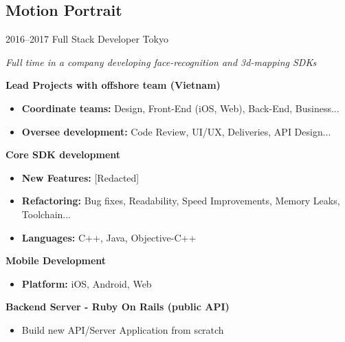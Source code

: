 \documentclass[]{template/friggeri-cv} %
\begin{document}
\subsection{Motion Portrait}
\begin{entrylist}


\entry
{2016--2017}
{Full Stack Developer}
{Tokyo}
{\emph{Full time in a company developing face-recognition and 3d-mapping SDKs}

\textbf{Lead Projects with offshore team (Vietnam)} 
\begin{itemize}
\item \textbf{Coordinate teams:} Design, Front-End (iOS, Web), Back-End, Business...
\item \textbf{Oversee development:} Code Review, UI/UX, Deliveries, API Design...
\end{itemize}
\textbf{Core SDK development} 
\begin{itemize}
\item \textbf{New Features:} [Redacted]
\item \textbf{Refactoring:} Bug fixes, Readability, Speed Improvements, Memory Leaks, Toolchain...
\item \textbf{Languages:} C++, Java, Objective-C++

\end{itemize}
\textbf{Mobile Development} 
\begin{itemize}
\item \textbf{Platform:} iOS, Android, Web
\end{itemize}

\textbf{Backend Server - Ruby On Rails (public API)} 
\begin{itemize}
\item Build new API/Server Application from scratch
\end{itemize}
}
\end{entrylist}



\end{document}
